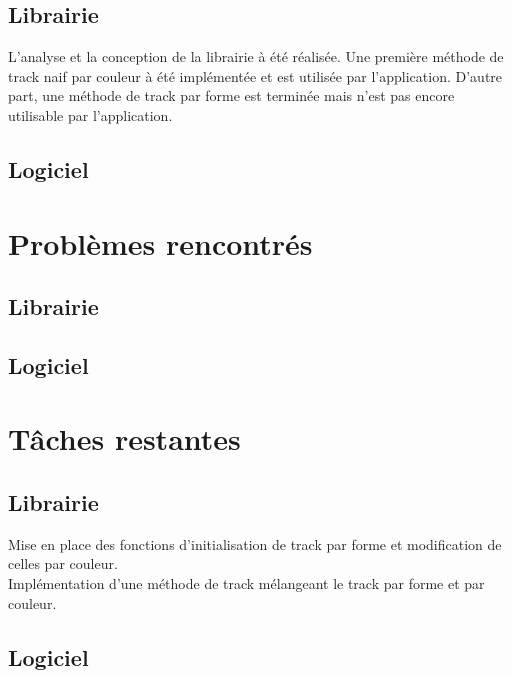 \documentclass{article}
\begin{document}
		\subsection{Librairie}
			L'analyse et la conception de la librairie à été réalisée. Une première méthode de track naif par couleur à été implémentée et est utilisée par l'application. D'autre part, une méthode de track par forme est terminée mais n'est pas encore utilisable par l'application.
		\subsection{Logiciel}
	\section{Problèmes rencontrés}
		\subsection{Librairie}
		\subsection{Logiciel}
	\section{Tâches restantes}
		\subsection{Librairie}
			Mise en place des fonctions d'initialisation de track par forme et modification de celles par couleur.\\
			Implémentation d'une méthode de track mélangeant le track par forme et par couleur.\\
		\subsection{Logiciel}
\end{document}
